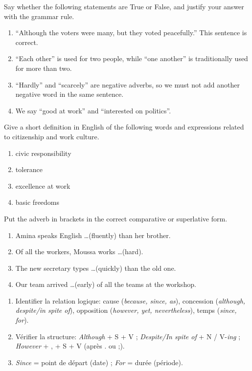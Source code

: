 \documentclass[11pt]{article}
\newcounter{popsec}
\newcounter{popsub}
\newcommand{\courssub}[1]{%
  \stepcounter{popsub}%
  \par\vspace{9pt}\noindent{\popxbold\fontsize{11.5}{13}\selectfont\color{popink}{\color{poporange}\thepopsec.\thepopsub}\hspace{6pt}#1}\par\nopagebreak\vspace{4pt}
}
\begin{document}
\begin{exercice}
Say whether the following statements are True or False, and justify your answer with the grammar rule.
\begin{enumerate}
\item ``Although the voters were many, but they voted peacefully.'' This sentence is correct.
\item ``Each other'' is used for two people, while ``one another'' is traditionally used for more than two.
\item ``Hardly'' and ``scarcely'' are negative adverbs, so we must not add another negative word in the same sentence.
\item We say ``good at work'' and ``interested on politics''.
\end{enumerate}
\end{exercice}

\begin{exercice}[Definitions]
Give a short definition in English of the following words and expressions related to citizenship and work culture.
\begin{enumerate}
\item civic responsibility
\item tolerance
\item excellence at work
\item basic freedoms
\end{enumerate}
\end{exercice}

\begin{exercice}
Put the adverb in brackets in the correct comparative or superlative form.
\begin{enumerate}
\item Amina speaks English \ldots (fluently) than her brother.
\item Of all the workers, Moussa works \ldots (hard).
\item The new secretary types \ldots (quickly) than the old one.
\item Our team arrived \ldots (early) of all the teams at the workshop.
\end{enumerate}
\end{exercice}

\courssub{Je m'entraîne}

\begin{methode}
\begin{enumerate}
\item Identifier la relation logique: cause (\emph{because, since, as}), concession (\emph{although, despite/in spite of}), opposition (\emph{however, yet, nevertheless}), temps (\emph{since, for}).
\item Vérifier la structure: \emph{Although} + S + V ; \emph{Despite/In spite of} + N / V-\emph{ing} ; \emph{However} + , + S + V (après . ou ;).
\item \emph{Since} = point de départ (date) ; \emph{For} = durée (période).
\end{enumerate}
\end{methode}
\end{document}
